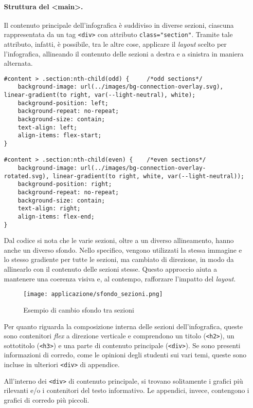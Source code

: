 \paragraph{Struttura del <main>.}\label{par:app_main} 
Il contenuto principale dell'infografica è suddiviso in diverse sezioni, ciascuna rappresentata da un tag \texttt{<div>} con attributo \texttt{class="section"}. Tramite tale attributo, infatti,
è possibile, tra le altre cose, applicare il \emph{layout} scelto per l'infografica, allineando il contenuto delle sezioni a destra e a sinistra in maniera alternata.
\begin{lstlisting}[style=std]
#content > .section:nth-child(odd) {     /*odd sections*/
    background-image: url(../images/bg-connection-overlay.svg), linear-gradient(to right, var(--light-neutral), white);
    background-position: left;
    background-repeat: no-repeat;
    background-size: contain;
    text-align: left;
    align-items: flex-start;
}

#content > .section:nth-child(even) {    /*even sections*/
    background-image: url(../images/bg-connection-overlay-rotated.svg), linear-gradient(to right, white, var(--light-neutral));
    background-position: right;
    background-repeat: no-repeat;
    background-size: contain;
    text-align: right;
    align-items: flex-end;
}
\end{lstlisting}
Dal codice si nota che le varie sezioni, oltre a un diverso allineamento, hanno anche un diverso sfondo. Nello specifico, vengono utilizzati la stessa immagine 
e lo stesso gradiente per tutte le sezioni, ma cambiato di direzione, in modo da allinearlo con il contenuto delle sezioni stesse. 
Questo approccio aiuta a mantenere una coerenza visiva e, al contempo, rafforzare l'impatto del \emph{layout}.
\begin{figure}[h]
    \centering
    \texttt{[image: applicazione/sfondo\_sezioni.png]}
    \caption{Esempio di cambio sfondo tra sezioni}
    \label{fig:app_sfondo_sezione}
\end{figure}

Per quanto riguarda la composizione interna delle sezioni dell'infografica, queste sono contenitori \emph{flex} a direzione verticale e comprendono un titolo (\texttt{<h2>}), un sottotitolo (\texttt{<h3>}) e una parte di 
contenuto principale (\texttt{<div>}). Se sono presenti informazioni di corredo, come le opinioni degli studenti sui vari temi, queste sono incluse in ulteriori \texttt{<div>} di appendice.

All'interno dei \texttt{<div>} di contenuto principale, si trovano solitamente i grafici più rilevanti e/o i contenitori del testo informativo. Le appendici, invece, contengono i grafici di corredo più piccoli. 


